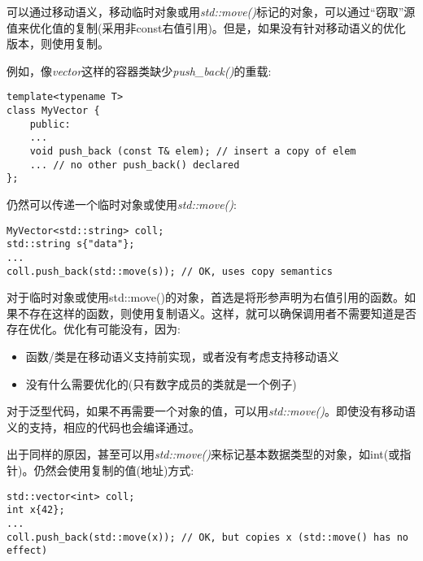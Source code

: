 可以通过移动语义，移动临时对象或用\textit{std::move()}标记的对象，可以通过“窃取”源值来优化值的复制(采用非const右值引用)。但是，如果没有针对移动语义的优化版本，则使用复制。\par

例如，像\textit{vector}这样的容器类缺少\textit{push\_back()}的重载:\par

\begin{lstlisting}[caption={}]
template<typename T>
class MyVector {
	public:
	...
	void push_back (const T& elem); // insert a copy of elem
	... // no other push_back() declared
};
\end{lstlisting}
	
仍然可以传递一个临时对象或使用\textit{std::move()}:\par

\begin{lstlisting}[caption={}]
MyVector<std::string> coll;
std::string s{"data"};
...
coll.push_back(std::move(s)); // OK, uses copy semantics
\end{lstlisting}	
	
对于临时对象或使用std::move()的对象，首选是将形参声明为右值引用的函数。如果不存在这样的函数，则使用复制语义。这样，就可以确保调用者不需要知道是否存在优化。优化有可能没有，因为:\par
	
\begin{itemize}
	\item 函数/类是在移动语义支持前实现，或者没有考虑支持移动语义
	\item 没有什么需要优化的(只有数字成员的类就是一个例子)
\end{itemize}
	
对于泛型代码，如果不再需要一个对象的值，可以用\textit{std::move()}。即使没有移动语义的支持，相应的代码也会编译通过。\par
	
出于同样的原因，甚至可以用\textit{std::move()}来标记基本数据类型的对象，如int(或指针)。仍然会使用复制的值(地址)方式:\par
	
\begin{lstlisting}[caption={}]
std::vector<int> coll;
int x{42};
...
coll.push_back(std::move(x)); // OK, but copies x (std::move() has no effect)
\end{lstlisting}
	
	
	